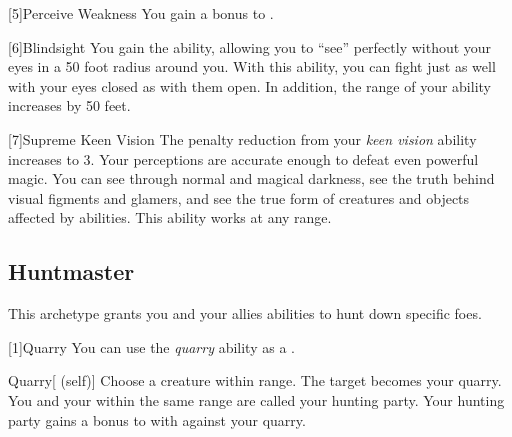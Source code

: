         [5]{Perceive Weakness}
        You gain a  bonus to .

        [6]{Blindsight}
        You gain the  ability, allowing you to ``see'' perfectly without your eyes in a 50 foot radius around you.
        With this ability, you can fight just as well with your eyes closed as with them open.
        In addition, the range of your  ability increases by 50 feet.

        [7]{Supreme Keen Vision}
        The penalty reduction from your \textit{keen vision} ability increases to 3.
        Your perceptions are accurate enough to defeat even powerful magic.
        You can see through normal and magical darkness, see the truth behind visual figments and glamers, and see the true form of creatures and objects affected by  abilities.
        This ability works at any range.

    \subsection{Huntmaster}
        This archetype grants you and your allies abilities to hunt down specific foes.

        [1]{Quarry}\label{Quarry} You can use the \textit{quarry} ability as a .
        \begin{attuneability}{Quarry}[ (self)]
            Choose a creature within \rnglong range.
            The target becomes your quarry.
            You and your  within the same range are called your hunting party.
            Your hunting party gains a  bonus to  with  against your quarry.
        \end{attuneability}


